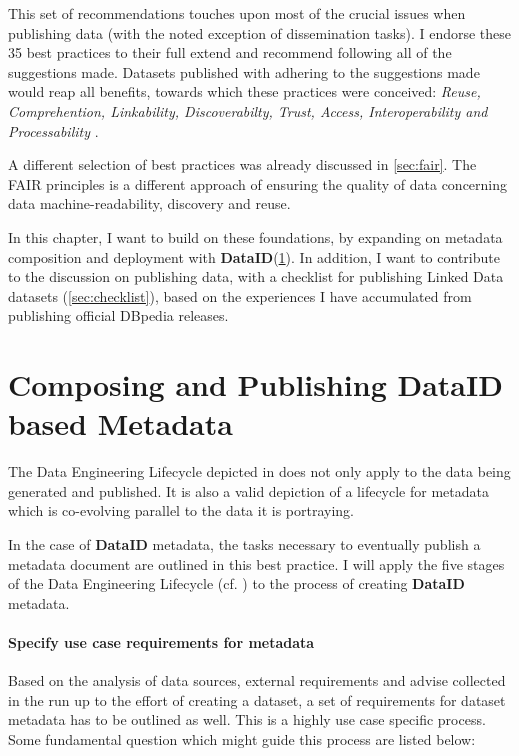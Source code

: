 \documentclass[a4paper,english,twoside,BCOR1.5cm,headsepline,DIV12,appendixprefix,final,12pt]{scrbook}
\newcommand{\dataid}{{\ttfamily\bfseries DataID}\xspace}
\begin{document}

This set of recommendations touches upon most of the crucial issues when publishing data (with the noted exception of dissemination tasks). I endorse these 35 best practices to their full extend and recommend following all of the suggestions made. Datasets published with adhering to the suggestions made would reap all benefits, towards which these practices were conceived: \textit{Reuse, Comprehention, Linkability, Discoverabilty, Trust, Access, Interoperability and Processability} \cite{dwbpW3C2016}.

A different selection of best practices was already discussed in \cref{sec:fair}. The FAIR principles \cite{fair2016} is a different approach of ensuring the quality of data concerning data machine-readability, discovery and reuse. 

In this chapter, I want to build on these foundations, by expanding on metadata composition and deployment with \dataid (\cref{sec:composingmetadata}). In addition, I want to contribute to the discussion on publishing data, with a checklist for publishing Linked Data datasets (\cref{sec:checklist}), based on the experiences I have accumulated from publishing official DBpedia releases.

\section{Composing and Publishing DataID based Metadata} 
\label{sec:composingmetadata}
The Data Engineering Lifecycle depicted in  does not only apply to the data being generated and published. It is also a valid depiction of a lifecycle for metadata which is co-evolving parallel to the data it is portraying.

In the case of \dataid metadata, the tasks necessary to eventually publish a metadata document are outlined in this best practice. I will apply the five stages of the 
Data Engineering Lifecycle (cf. ) to the process of creating \dataid metadata.

\paragraph{Specify use case requirements for metadata}
\label{sec:wfspecify}

Based on the analysis of data sources, external requirements and advise collected in the run up to the effort of creating a dataset, a set of requirements for dataset metadata has to be outlined as well. This is a highly use case specific process. Some fundamental question which might guide this process are listed below:
\end{document}
